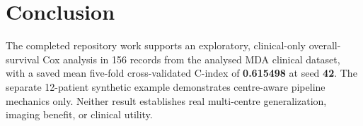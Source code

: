 \documentclass[conference]{IEEEtran}
\begin{document}
\section{Conclusion}
The completed repository work supports an exploratory, clinical-only overall-survival Cox analysis in 156 records from the analysed MDA clinical dataset, with a saved mean five-fold cross-validated C-index of \textbf{0.615498} at seed \textbf{42}. The separate 12-patient synthetic example demonstrates centre-aware pipeline mechanics only. Neither result establishes real multi-centre generalization, imaging benefit, or clinical utility.



\end{document}
